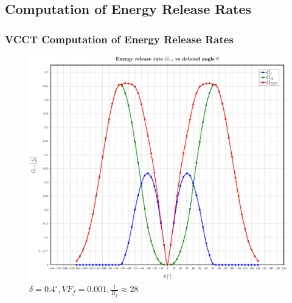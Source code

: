 \documentclass[first,firstsupp,lastsupp,handout,last,hyperref,table]{ETHclass}
\begin{document}
\subsection[$G_{c}$ Computation]{Computation of Energy Release Rates}

\begin{frame}
\frametitle{VCCT Computation of Energy Release Rates}
\vspace{-0.35cm}
\centering
\captionsetup[subfigure]{font=scriptsize,labelfont=scriptsize}
\begin{figure}[!h]
\centering
\includegraphics[height=0.7\textheight]{2017-03-03_AbqRunSummary_Gs.pdf}
 \caption{$\delta=0.4^{\circ},VF_{f}=0.001,\frac{l}{R_{f}}\approx28$}
  \label{fig:vcct-gc}
\end{figure}
\end{frame}
\end{document}
